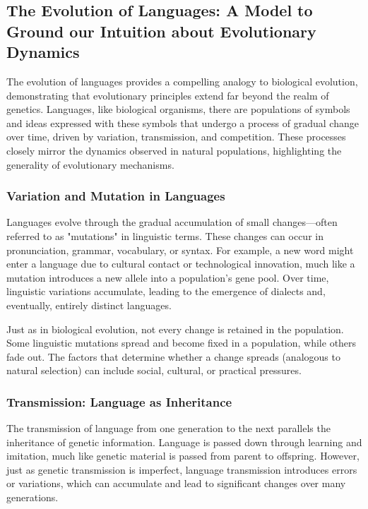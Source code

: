 \documentclass[10pt,a4paper]{scrbook}
\begin{document}
\subsection{The Evolution of Languages: A Model to Ground our Intuition about Evolutionary Dynamics}

The evolution of languages provides a compelling analogy to biological evolution, demonstrating that evolutionary principles extend far beyond the realm of genetics. Languages, like biological organisms, there are populations of symbols and ideas expressed with these symbols that undergo a process of gradual change over time, driven by variation, transmission, and competition. These processes closely mirror the dynamics observed in natural populations, highlighting the generality of evolutionary mechanisms.

\subsubsection{Variation and Mutation in Languages}

Languages evolve through the gradual accumulation of small changes—often referred to as "mutations" in linguistic terms. These changes can occur in pronunciation, grammar, vocabulary, or syntax. For example, a new word might enter a language due to cultural contact or technological innovation, much like a mutation introduces a new allele into a population's gene pool. Over time, linguistic variations accumulate, leading to the emergence of dialects and, eventually, entirely distinct languages.

Just as in biological evolution, not every change is retained in the population. Some linguistic mutations spread and become fixed in a population, while others fade out. The factors that determine whether a change spreads (analogous to natural selection) can include social, cultural, or practical pressures.

\subsubsection{Transmission: Language as Inheritance}

The transmission of language from one generation to the next parallels the inheritance of genetic information. Language is passed down through learning and imitation, much like genetic material is passed from parent to offspring. However, just as genetic transmission is imperfect, language transmission introduces errors or variations, which can accumulate and lead to significant changes over many generations.
\end{document}

